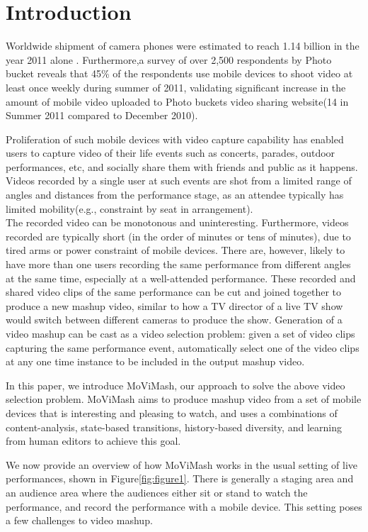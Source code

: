 \documentclass{sig-alternate}
\begin{document}
\section{Introduction}
Worldwide shipment of camera phones were estimated to reach 1.14 billion in the year 2011 alone \cite{zinn1996quantum}.
Furthermore,a survey of over 2,500 respondents by Photo bucket reveals that 45\% of the respondents use mobile devices to shoot video at least once weekly during summer of 2011, validating significant increase in the amount of mobile video uploaded to Photo buckets video sharing website(14 in Summer 2011 compared to December 2010)\cite{cabrera2001path}.

 Proliferation of such mobile devices with video capture capability has enabled users to capture video of their life events such as concerts, parades, outdoor performances, etc, and socially share them with friends and public as it happens. Videos recorded by a single user at such events are shot from a limited range of angles and distances from the performance stage, as an attendee typically has limited mobility(e.g., constraint by seat in arrangement).\\ The recorded video can be monotonous and uninteresting. Furthermore, videos recorded are typically short (in the order of minutes or tens of minutes), due to tired arms or power constraint of mobile devices. There are, however, likely to have more than one users recording the same performance from different angles at the same time, especially at a well-attended performance. These recorded and shared video clips of the same performance can be cut and joined together to produce a new mashup video, similar to how a TV director of a live TV show would switch between different cameras to produce the show. Generation of a video mashup can be cast as a video selection problem: given a set of video clips capturing the same performance event, automatically select one of the video clips at any one time instance to be included in the output mashup video.

 In this paper, we introduce MoViMash, our approach to solve the above video selection problem. MoViMash aims to produce mashup video from a set of mobile devices that is interesting and pleasing to watch, and uses a combinations of content-analysis, state-based transitions, history-based diversity, and learning from human editors to achieve this goal.

 We now provide an overview of how MoViMash works in the usual setting of live performances, shown in Figure\ref{fig:figure1}. There is generally a staging area and an audience area where the audiences either sit or stand to watch the performance, and record the performance with a mobile device. This setting poses a few challenges to video mashup.
 
\end{document}

